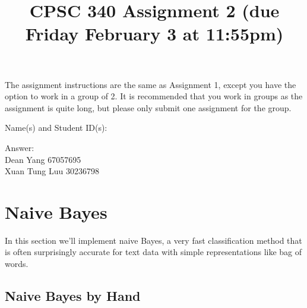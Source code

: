 \documentclass{article}
\def\ans#1{\par\gre{Answer: #1}}
\def\blu#1{{\color{blu}#1}}
\def\gre#1{{\color{gre}#1}}
\begin{document}
\title{CPSC 340 Assignment 2 (due Friday February 3 at 11:55pm)}
\author{}
\date{}
\maketitle
\vspace{-4em}


The assignment instructions are the same as Assignment 1, except you have the option to work in a group of 2.
It is recommended that you work in groups as the assignment is quite long, but please only submit one assignment for the group.

\blu{Name(s) and Student ID(s):}
\ans{\\
Dean Yang 67057695\\
Xuan Tung Luu 30236798
}
\section{Naive Bayes}

In this section we'll implement naive Bayes, a very fast classification method that is often surprisingly accurate for text data with simple representations like bag of words.


\subsection{Naive Bayes by Hand}
\end{document}
